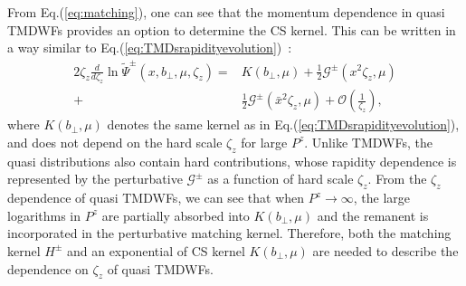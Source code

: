 \documentclass[prd,aps,twocolumn,preprintnumbers, showpacs, nofootinbib,superscriptaddress,notitlepage]{revtex4-1}
\begin{document}
From Eq.(\ref{eq:matching}), one can see that the momentum dependence in   quasi TMDWFs provides an option to determine the CS kernel. This can be written  in a way similar to Eq.(\ref{eq:TMDsrapidityevolution})~\cite{Ji:2021znw}: 
\begin{align}
	2 \zeta_z \frac{d}{d \zeta_z} \ln \tilde \Psi^{\pm}\left(x, b_{\perp}, \mu, \zeta_z\right)=&K\left(b_{\perp}, \mu\right) +\frac{1}{2}\mathcal{G}^{\pm}\left(x^2\zeta_z,\mu\right) \nonumber\\
	+& \frac{1}{2}\mathcal{G}^{\pm}\left(\bar{x}^2\zeta_z,\mu\right)+\mathcal{O}\left(\frac{1}{\zeta_z}\right), \label{eq:quasiTMDsrapidityevolution}
\end{align}
where $K\left(b_{\perp}, \mu\right)$ denotes the same kernel as in Eq.(\ref{eq:TMDsrapidityevolution}), and does not depend on the hard scale $\zeta_z$ for large $P^z$. Unlike TMDWFs, the  quasi distributions also contain hard contributions, whose  rapidity dependence is  represented by the perturbative  $\mathcal{G}^{\pm}$ as a function of hard scale $\zeta_z$. 
From the $\zeta_z$ dependence of quasi TMDWFs, we can see that when $P^z\to\infty$, the large logarithms in $P^z$ are partially absorbed into $K\left(b_{\perp}, \mu\right)$  and the remanent is incorporated in the perturbative matching kernel. Therefore,  both the matching kernel $H^{\pm}$  and an exponential of  CS kernel $K\left(b_{\perp}, \mu\right)$ are needed to describe the dependence on $\zeta_z$ of quasi TMDWFs. 
\end{document}
